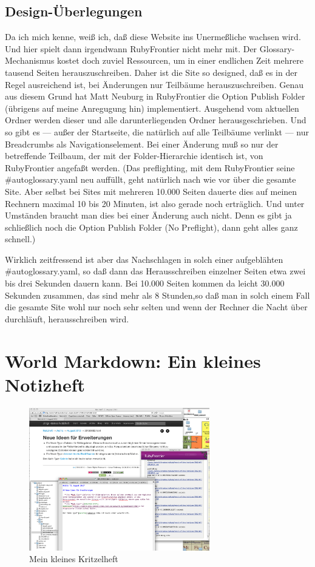\documentclass[11pt]{report}
\begin{document}
\section{Design-Überlegungen}
\label{sec-2-12-1}


Da ich mich kenne, weiß ich, daß diese Website ins Unermeßliche
wachsen wird. Und hier spielt dann irgendwann RubyFrontier nicht mehr
mit. Der Glossary-Mechanismus kostet doch zuviel Ressourcen, um in
einer endlichen Zeit mehrere tausend Seiten herauszuschreiben. Daher
ist die Site so designed, daß es in der Regel ausreichend ist, bei
Änderungen nur Teilbäume herauszuschreiben. Genau aus diesem Grund hat
Matt Neuburg in RubyFrontier die Option Publish Folder (übrigens auf
meine Anregugung hin) implementiert. Ausgehend vom aktuellen Ordner
werden dieser und alle darunterliegenden Ordner herausgeschrieben. Und
so gibt es — außer der Startseite, die natürlich auf alle Teilbäume
verlinkt — nur Breadcrumbs als Navigationselement. Bei einer Änderung
muß so nur der betreffende Teilbaum, der mit der Folder-Hierarchie
identisch ist, von RubyFrontier angefaßt werden. (Das preflighting,
mit dem RubyFrontier seine \#autoglossary.yaml neu auffüllt, geht
natürlich nach wie vor über die gesamte Site. Aber selbst bei Sites
mit mehreren 10.000 Seiten dauerte dies auf meinen Rechnern maximal 10
bis 20 Minuten, ist also gerade noch erträglich. Und unter Umständen
braucht man dies bei einer Änderung auch nicht. Denn es gibt ja
schließlich noch die Option Publish Folder (No Preflight), dann geht
alles ganz schnell.)


Wirklich zeitfressend ist aber das Nachschlagen in solch einer
aufgeblähten \#autoglossary.yaml, so daß dann das Herausschreiben
einzelner Seiten etwa zwei bis drei Sekunden dauern kann. Bei 10.000
Seiten kommen da leicht 30.000 Sekunden zusammen, das sind mehr als 8
Stunden,so daß man in solch einem Fall die gesamte Site wohl nur noch
sehr selten und wenn der Rechner die Nacht über durchläuft,
herausschreiben wird.
\chapter{World Markdown: Ein kleines Notizheft}
\label{sec-2-13}


\begin{figure}[h!]
\centering
\includegraphics[width=0.7\textwidth]{./images/screenshot-tn-rubyfrontier.png}
\caption{\label{screenshot-tn-rubyfrontier}Mein kleines Kritzelheft}
\end{figure}
\end{document}

